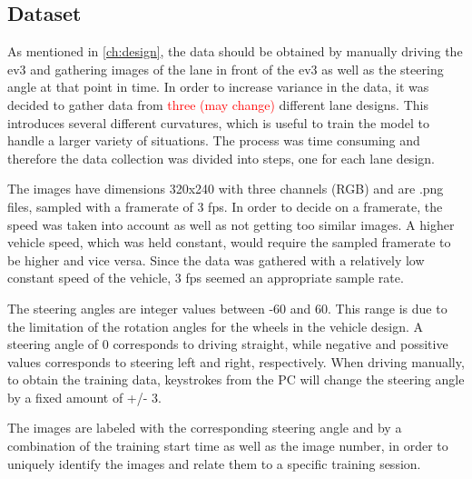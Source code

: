 \subsection{Dataset}\label{ssec:impl-data-dataset}
As mentioned in \autoref{ch:design}, the data should be obtained by manually driving the ev3 and gathering images of the lane in front of the ev3 as well as the steering angle at that point in time.
In order to increase variance in the data, it was decided to gather data from \textcolor{red}{three (may change)} different lane designs.
This introduces several different curvatures, which is useful to train the model to handle a larger variety of situations.
The process was time consuming and therefore the data collection was divided into steps, one for each lane design.

The images have dimensions 320x240 with three channels (RGB) and are .png files, sampled with a framerate of 3 fps.
In order to decide on a framerate, the speed was taken into account as well as not getting too similar images.
A higher vehicle speed, which was held constant, would require the sampled framerate to be higher and vice versa.
Since the data was gathered with a relatively low constant speed of the vehicle, 3 fps seemed an appropriate sample rate.

The steering angles are integer values between -60 and 60.
This range is due to the limitation of the rotation angles for the wheels in the vehicle design.
 A steering angle of 0 corresponds to driving straight, while negative and possitive values corresponds to steering left and right, respectively.
When driving manually, to obtain the training data, keystrokes from the PC will change the steering angle by a fixed amount of +/- 3.

The images are labeled with the corresponding steering angle and by a combination of the training start time as well as the image number, in order to uniquely identify the images and relate them to a specific training session.
